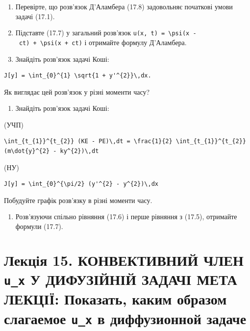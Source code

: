 \documentclass[
  ukrainian,
]{article}
\providecommand{\tightlist}{%
  \setlength{\itemsep}{0pt}\setlength{\parskip}{0pt}}
\begin{document}
\begin{enumerate}
\def\labelenumi{\arabic{enumi}.}
\item
  Перевірте, що розв'язок Д'Аламбера (17.8) задовольняє початкові умови
  задачі (17.1).
\item
  Підставте (17.7) у загальний розв'язок
  \texttt{u(x,\ t)\ =\ \textbackslash{}psi(x\ -\ ct)\ +\ \textbackslash{}psi(x\ +\ ct)}
  і отримайте формулу Д'Аламбера.
\item
  Знайдіть розв'язок задачі Коші:
\end{enumerate}

\begin{verbatim}
J[y] = \int_{0}^{1} \sqrt{1 + y'^{2}}\,dx.
\end{verbatim}

Як виглядає цей розв'язок у різні моменти часу?

\begin{enumerate}
\def\labelenumi{\arabic{enumi}.}
\setcounter{enumi}{3}
\tightlist
\item
  Знайдіть розв'язок задачі Коші:
\end{enumerate}

(УЧП)

\begin{verbatim}
\int_{t_{1}}^{t_{2}} (KE - PE)\,dt = \frac{1}{2} \int_{t_{1}}^{t_{2}} (m\dot{y}^{2} - ky^{2})\,dt
\end{verbatim}

(НУ)

\begin{verbatim}
J[y] = \int_{0}^{\pi/2} (y'^{2} - y^{2})\,dx
\end{verbatim}

Побудуйте графік розв'язку в різні моменти часу.

\begin{enumerate}
\def\labelenumi{\arabic{enumi}.}
\setcounter{enumi}{4}
\tightlist
\item
  Розв'язуючи спільно рівняння (17.6) і перше рівняння з (17.5),
  отримайте формули (17.7).
\end{enumerate}

\section{\texorpdfstring{Лекція 15. КОНВЕКТИВНИЙ ЧЛЕН \texttt{u\_x} У
ДИФУЗІЙНІЙ ЗАДАЧІ МЕТА ЛЕКЦІЇ: Показать, каким образом слагаемое
\texttt{u\_x} в диффузионной
задаче}{Лекція 15. КОНВЕКТИВНИЙ ЧЛЕН u\_x У ДИФУЗІЙНІЙ ЗАДАЧІ МЕТА ЛЕКЦІЇ: Показать, каким образом слагаемое u\_x в диффузионной задаче}}\label{ux43bux435ux43aux446ux456ux44f-15.-ux43aux43eux43dux432ux435ux43aux442ux438ux432ux43dux438ux439-ux447ux43bux435ux43d-u_x-ux443-ux434ux438ux444ux443ux437ux456ux439ux43dux456ux439-ux437ux430ux434ux430ux447ux456-ux43cux435ux442ux430-ux43bux435ux43aux446ux456ux457-ux43fux43eux43aux430ux437ux430ux442ux44c-ux43aux430ux43aux438ux43c-ux43eux431ux440ux430ux437ux43eux43c-ux441ux43bux430ux433ux430ux435ux43cux43eux435-u_x-ux432-ux434ux438ux444ux444ux443ux437ux438ux43eux43dux43dux43eux439-ux437ux430ux434ux430ux447ux435}
\end{document}
